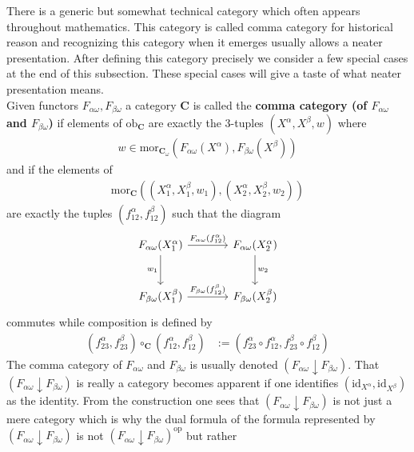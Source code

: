 There is a generic but somewhat technical category which often appears throughout mathematics. This category is called comma category for historical reason and recognizing this category when it emerges usually allows a neater presentation. After defining this category precisely we consider a few special cases at the end of this subsection. These special cases will give a taste of what neater presentation means.
\\
Given functors $F_{\alpha\omega},F_{\beta\omega}$ a category $\mathbf{C}$ is called the \textbf{comma category (of $F_{\alpha\omega}$ and $F_{\beta\omega}$)} if elements of $\mathrm{ob}_{\mathbf{C}}$ are exactly the $3$-tuples $(X^{\alpha},X^{\beta},w)$ where
\begin{align*}
  w
  \in
  \mathrm{mor}_{\mathbf{C}_{\omega}}
  \left(
    F_{\alpha\omega}(X^{\alpha}),
    F_{\beta\omega}(X^{\beta})
  \right)
\end{align*}
and if the elements of
\begin{align*}
  \mathrm{mor}_{\mathbf{C}}
  \left(
    (X_{1}^{\alpha},X_{1}^{\beta},w_{1}),
    (X_{2}^{\alpha},X_{2}^{\beta},w_{2})
  \right)
\end{align*}
are exactly the tuples $(f_{12}^{\alpha},f_{12}^{\beta})$ such that the diagram 
\[
\begin{tikzcd}[sep=large]
  F_{\alpha\omega}(X_{1}^{\alpha})
  \arrow{r}{F_{\alpha\omega}(f_{12}^{\alpha})}
  \arrow[swap]{d}{w_{1}}
  &
  F_{\alpha\omega}(X_{2}^{\alpha})
  \arrow{d}{w_{2}}
  \\
  F_{\beta\omega}(X_{1}^{\beta})
  \arrow{r}{F_{\beta\omega}(f_{12}^{\beta})}
  &
  F_{\beta\omega}(X_{2}^{\beta})
\end{tikzcd}
\]
commutes while composition is defined by
\begin{align*}
  (f_{23}^{\alpha},f_{23}^{\beta})
  \circ_{\mathbf{C}}
  (f_{12}^{\alpha},f_{12}^{\beta})
  &:=
  (f_{23}^{\alpha} \circ f_{12}^{\alpha},f_{23}^{\beta} \circ f_{12}^{\beta})
\end{align*}
The comma category of $F_{\alpha\omega}$ and $F_{\beta\omega}$ is usually denoted $(F_{\alpha\omega} \downarrow F_{\beta\omega})$. That $(F_{\alpha\omega} \downarrow F_{\beta\omega})$ is really a category becomes apparent if one identifies $(\mathrm{id}_{X^{\alpha}},\mathrm{id}_{X^{\beta}})$ as the identity. From the construction one sees that $(F_{\alpha\omega} \downarrow F_{\beta\omega})$ is not just a mere category which is why the dual formula of the formula represented by $(F_{\alpha\omega} \downarrow F_{\beta\omega})$ is not $(F_{\alpha\omega} \downarrow F_{\beta\omega})^{\mathrm{op}}$ but rather
